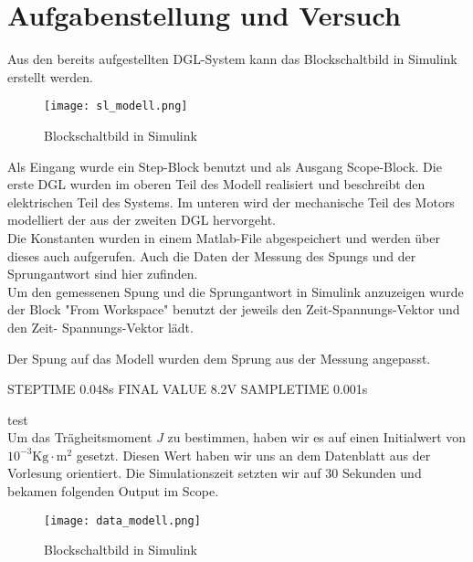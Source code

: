 \section{Aufgabenstellung und Versuch}

Aus den bereits aufgestellten DGL-System kann das Blockschaltbild in Simulink
erstellt werden.

\begin{figure}[H]
    \centering
    \texttt{[image: sl\_modell.png]}
    \caption{Blockschaltbild in Simulink}
    \label{fig:Blockschaltbild}
\end{figure}

Als Eingang wurde ein Step-Block benutzt und als Ausgang Scope-Block.
Die erste DGL wurden im oberen Teil des Modell realisiert und beschreibt
den elektrischen Teil des Systems. Im unteren wird der mechanische Teil
des Motors modelliert der aus der zweiten DGL hervorgeht.\\

Die Konstanten wurden in einem Matlab-File abgespeichert und werden über
dieses auch aufgerufen. Auch die Daten der Messung des Spungs und der
Sprungantwort sind hier zufinden.\\

Um den gemessenen Spung und die Sprungantwort in Simulink anzuzeigen wurde der Block
"From Workspace" benutzt der jeweils den Zeit-Spannungs-Vektor und den Zeit-
Spannungs-Vektor lädt.

Der Spung auf das Modell wurden dem Sprung aus der Messung angepasst.

STEPTIME 0.048s
FINAL VALUE 8.2V
SAMPLETIME 0.001s

test\\

Um das Trägheitsmoment $J$ zu bestimmen, haben wir es auf einen Initialwert
von $10^{-3}\mathrm{Kg \cdot m^2}$ gesetzt. Diesen Wert haben wir uns an dem
Datenblatt aus der Vorlesung orientiert. Die Simulationszeit setzten wir auf
30 Sekunden und bekamen folgenden Output im Scope.

\begin{figure}[H]
    \centering
    \texttt{[image: data\_modell.png]}
    \caption{Blockschaltbild in Simulink}
    \label{fig:Blockschaltbild}
\end{figure}


